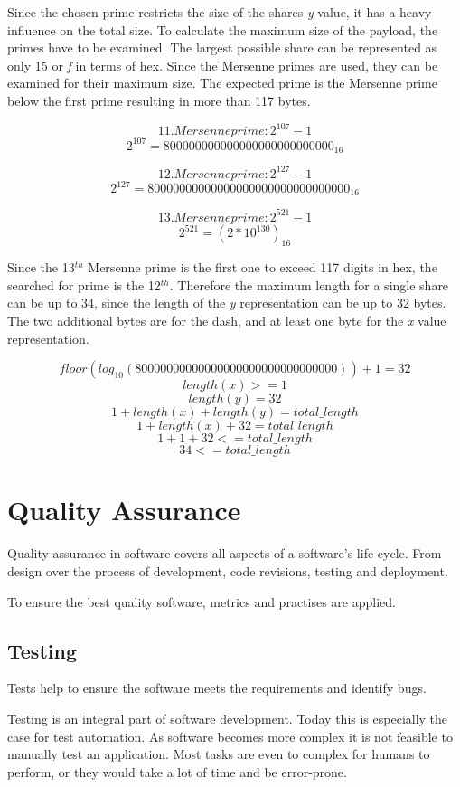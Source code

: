 Since the chosen prime restricts the size of the shares \textit{y} value, it
has a heavy influence on the total size. To calculate the maximum size of the
payload, the primes have to be examined. The largest possible share can be
represented as only 15 or \textit{f} in terms of hex. Since the Mersenne primes
are used, they can be examined for their maximum size. The expected prime is
the Mersenne prime below the first prime resulting in more than 117 bytes.

$$11. Mersenne prime: 2^{107}-1$$
$$2^{107} = 800000000000000000000000000_{16}$$

$$12. Mersenne prime: 2^{127}-1$$
$$2^{127} = 80000000000000000000000000000000_{16}$$

$$13. Mersenne prime: 2^{521}-1$$
$$2^{521} = (2*10^{130})_{16}$$

Since the 13$^{th}$ Mersenne prime is the first one to exceed 117 digits in
hex, the searched for prime is the 12$^{th}$. Therefore the maximum length for
a single share can be up to 34, since the length of the \textit{y}
representation can be up to 32 bytes. The two additional bytes are for the
dash, and at least one byte for the \textit{x} value representation.

$$floor(log_{10}(80000000000000000000000000000000)) + 1 = 32$$
$$length(x) >= 1$$
$$length(y) = 32$$
$$1 + length(x) + length(y) = total\_length$$
$$1 + length(x) + 32 = total\_length$$
$$1 + 1 + 32 <= total\_length$$
$$34 <= total\_length$$

\chapter{Quality Assurance}

Quality assurance in software covers all aspects of a software's life cycle.
From design over the process of development, code revisions, testing and
deployment.

To ensure the best quality software, metrics and practises are applied.

\section{Testing}

Tests help to ensure the software meets the requirements and identify bugs.

Testing is an integral part of software development. Today this is especially
the case for test automation. As software becomes more complex it is not
feasible to manually test an application. Most tasks are even to complex for
humans to perform, or they would take a lot of time and be error-prone.

